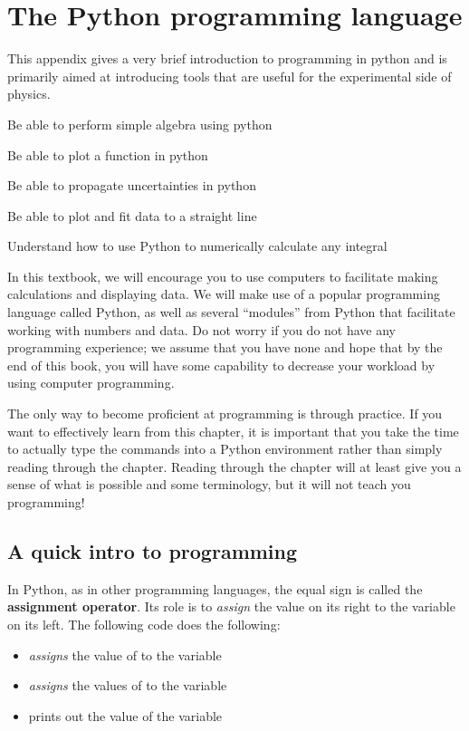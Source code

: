 \chapter{The Python programming language}
\label{app:python}
This appendix gives a very brief introduction to programming in python and is primarily aimed at introducing tools that are useful for the experimental side of physics. 
 \vspace{1cm}
\begin{learningObjectives}
{\item Be able to perform simple algebra using python
\item Be able to plot a function in python
\item Be able to propagate uncertainties in python
\item Be able to plot and fit data to a straight line
\item Understand how to use Python to numerically calculate any integral}
\end{learningObjectives}

In this textbook, we will encourage you to use computers to facilitate making calculations and displaying data. We will make use of a popular programming language called Python, as well as several ``modules'' from Python that facilitate working with numbers and data. Do not worry if you do not have any programming experience; we assume that you have none and hope that by the end of this book, you will have some capability to decrease your workload by using computer programming.

The only way to become proficient at programming is through practice. If you want to effectively learn from this chapter, it is important that you take the time to actually type the commands into a Python environment rather than simply reading through the chapter. Reading through the chapter will at least give you a sense of what is possible and some terminology, but it will not teach you programming!

\section{A quick intro to programming}
In Python, as in other programming languages, the equal sign is called the \textbf{assignment operator}. Its role is to \textit{assign} the value on its right to the variable on its left. The following code does the following:
\begin{itemize}
\item \textit{assigns} the value of  to the variable 
\item \textit{assigns} the values of  to the variable 
\item prints out the value of the variable 
\end{itemize}


